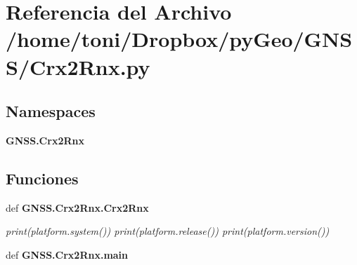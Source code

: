 \section{Referencia del Archivo /home/toni/\-Dropbox/py\-Geo/\-G\-N\-S\-S/\-Crx2\-Rnx.py}
\label{Crx2Rnx_8py}
\subsection*{Namespaces}
\begin{DoxyCompactItemize}
\item 
{\bf G\-N\-S\-S.\-Crx2\-Rnx}
\end{DoxyCompactItemize}
\subsection*{Funciones}
\begin{DoxyCompactItemize}
\item 
def {\bf G\-N\-S\-S.\-Crx2\-Rnx.\-Crx2\-Rnx}
\begin{DoxyCompactList}\small\item\em print(platform.\-system()) print(platform.\-release()) print(platform.\-version()) \end{DoxyCompactList}\item 
def {\bf G\-N\-S\-S.\-Crx2\-Rnx.\-main}
\end{DoxyCompactItemize}

